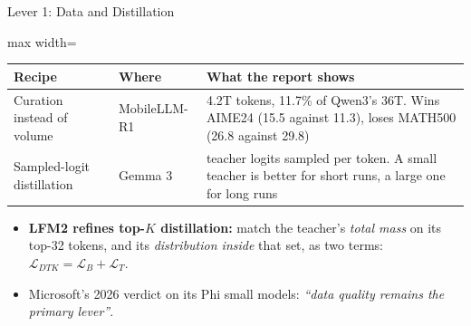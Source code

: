 \begin{frame}{Lever 1: Data and Distillation}
    \begin{center}
    \footnotesize
    \renewcommand{\arraystretch}{1.15}
    \begin{adjustbox}{max width=\linewidth}\begin{tabular}{>{\raggedright\arraybackslash}p{3.2cm}>{\raggedright\arraybackslash}p{2.0cm}>{\raggedright\arraybackslash}p{7.5cm}}
        \toprule
        \textbf{Recipe} & \textbf{Where} & \textbf{What the report shows} \\
        \midrule
        Curation instead of volume & MobileLLM-R1 & 4.2T tokens, 11.7\% of Qwen3's 36T. Wins AIME24 (15.5 against 11.3), loses MATH500 (26.8 against 29.8) \\
        Sampled-logit distillation & Gemma 3 & 256 teacher logits sampled per token. A small teacher is better for short runs, a large one for long runs \\
        \bottomrule
    \end{tabular}\end{adjustbox}
    \end{center}
    \begin{itemize}\itemsep0.3em
        \item \textbf{LFM2 refines top-$K$ distillation:} match the teacher's \emph{total mass} on its top-32 tokens, and its \emph{distribution inside} that set, as two terms: $\mathcal{L}_{DTK}=\mathcal{L}_{B}+\mathcal{L}_{T}$.
        \item Microsoft's 2026 verdict on its Phi small models: \emph{``data quality remains the primary lever''}.
    \end{itemize}
\end{frame}

